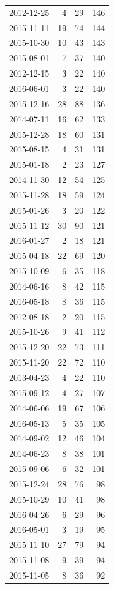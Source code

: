 \begin{tabular}{lrrr}
2012-12-25 & 4 & 29 & 146 \\
2015-11-11 & 19 & 74 & 144 \\
2015-10-30 & 10 & 43 & 143 \\
2015-08-01 & 7 & 37 & 140 \\
2012-12-15 & 3 & 22 & 140 \\
2016-06-01 & 3 & 22 & 140 \\
2015-12-16 & 28 & 88 & 136 \\
2014-07-11 & 16 & 62 & 133 \\
2015-12-28 & 18 & 60 & 131 \\
2015-08-15 & 4 & 31 & 131 \\
2015-01-18 & 2 & 23 & 127 \\
2014-11-30 & 12 & 54 & 125 \\
2015-11-28 & 18 & 59 & 124 \\
2015-01-26 & 3 & 20 & 122 \\
2015-11-12 & 30 & 90 & 121 \\
2016-01-27 & 2 & 18 & 121 \\
2015-04-18 & 22 & 69 & 120 \\
2015-10-09 & 6 & 35 & 118 \\
2014-06-16 & 8 & 42 & 115 \\
2016-05-18 & 8 & 36 & 115 \\
2012-08-18 & 2 & 20 & 115 \\
2015-10-26 & 9 & 41 & 112 \\
2015-12-20 & 22 & 73 & 111 \\
2015-11-20 & 22 & 72 & 110 \\
2013-04-23 & 4 & 22 & 110 \\
2015-09-12 & 4 & 27 & 107 \\
2014-06-06 & 19 & 67 & 106 \\
2016-05-13 & 5 & 35 & 105 \\
2014-09-02 & 12 & 46 & 104 \\
2014-06-23 & 8 & 38 & 101 \\
2015-09-06 & 6 & 32 & 101 \\
2015-12-24 & 28 & 76 & 98 \\
2015-10-29 & 10 & 41 & 98 \\
2016-04-26 & 6 & 29 & 96 \\
2016-05-01 & 3 & 19 & 95 \\
2015-11-10 & 27 & 79 & 94 \\
2015-11-08 & 9 & 39 & 94 \\
2015-11-05 & 8 & 36 & 92 \\

\end{tabular}
